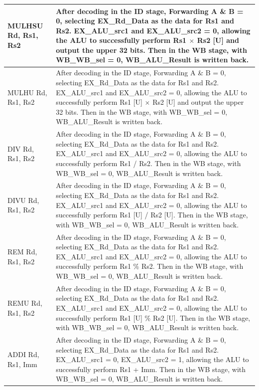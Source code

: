 \documentclass[12pt,a4paper]{report}
\begin{document}
\begin{longtable}{|l|p{12cm}|}
MULHSU Rd, Rs1, Rs2 & After decoding in the ID stage, Forwarding A \& B = 0, selecting EX\_Rd\_Data as the data for Rs1 and Rs2. EX\_ALU\_src1 and EX\_ALU\_src2 = 0, allowing the ALU to successfully perform Rs1 $\times$ Rs2 [U] and output the upper 32 bits. Then in the WB stage, with WB\_WB\_sel = 0, WB\_ALU\_Result is written back. \\
\hline

MULHU Rd, Rs1, Rs2 & After decoding in the ID stage, Forwarding A \& B = 0, selecting EX\_Rd\_Data as the data for Rs1 and Rs2. EX\_ALU\_src1 and EX\_ALU\_src2 = 0, allowing the ALU to successfully perform Rs1 [U] $\times$ Rs2 [U] and output the upper 32 bits. Then in the WB stage, with WB\_WB\_sel = 0, WB\_ALU\_Result is written back. \\
\hline

DIV Rd, Rs1, Rs2 & After decoding in the ID stage, Forwarding A \& B = 0, selecting EX\_Rd\_Data as the data for Rs1 and Rs2. EX\_ALU\_src1 and EX\_ALU\_src2 = 0, allowing the ALU to successfully perform Rs1 / Rs2. Then in the WB stage, with WB\_WB\_sel = 0, WB\_ALU\_Result is written back. \\
\hline

DIVU Rd, Rs1, Rs2 & After decoding in the ID stage, Forwarding A \& B = 0, selecting EX\_Rd\_Data as the data for Rs1 and Rs2. EX\_ALU\_src1 and EX\_ALU\_src2 = 0, allowing the ALU to successfully perform Rs1 [U] / Rs2 [U]. Then in the WB stage, with WB\_WB\_sel = 0, WB\_ALU\_Result is written back. \\
\hline

REM Rd, Rs1, Rs2 & After decoding in the ID stage, Forwarding A \& B = 0, selecting EX\_Rd\_Data as the data for Rs1 and Rs2. EX\_ALU\_src1 and EX\_ALU\_src2 = 0, allowing the ALU to successfully perform Rs1 \% Rs2. Then in the WB stage, with WB\_WB\_sel = 0, WB\_ALU\_Result is written back. \\
\hline

REMU Rd, Rs1, Rs2 & After decoding in the ID stage, Forwarding A \& B = 0, selecting EX\_Rd\_Data as the data for Rs1 and Rs2. EX\_ALU\_src1 and EX\_ALU\_src2 = 0, allowing the ALU to successfully perform Rs1 [U] \% Rs2 [U]. Then in the WB stage, with WB\_WB\_sel = 0, WB\_ALU\_Result is written back. \\
\hline

ADDI Rd, Rs1, Imm & After decoding in the ID stage, Forwarding A \& B = 0, selecting EX\_Rd\_Data as the data for Rs1 and Rs2. EX\_ALU\_src1 = 0, EX\_ALU\_src2 = 1, allowing the ALU to successfully perform Rs1 + Imm. Then in the WB stage, with WB\_WB\_sel = 0, WB\_ALU\_Result is written back. \\
\hline


\end{longtable}
\end{document}
